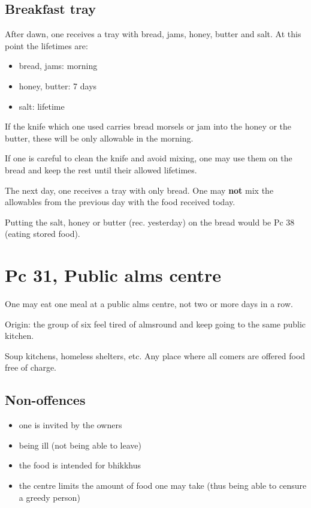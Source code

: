 \subsection{Breakfast tray}

After dawn, one receives a tray with bread, jams, honey, butter and
salt. At this point the lifetimes are:

\begin{itemize}
\tightlist
\item
  bread, jams: morning
\item
  honey, butter: 7 days
\item
  salt: lifetime
\end{itemize}

If the knife which one used carries bread morsels or jam into the honey
or the butter, these will be only allowable in the morning.

If one is careful to clean the knife and avoid mixing, one may use them
on the bread and keep the rest until their allowed lifetimes.

The next day, one receives a tray with only bread. One may \textbf{not}
mix the allowables from the previous day with the food received today.

Putting the salt, honey or butter (rec. yesterday) on the bread would be
Pc 38 (eating stored food).

\clearpage

\section{Pc 31, Public alms centre}

One may eat one meal at a public alms centre, not two or more days in a
row.

Origin: the group of six feel tired of almsround and keep going to the
same public kitchen.

Soup kitchens, homeless shelters, etc. Any place where all comers are
offered food free of charge.

\subsection{Non-offences}

\begin{itemize}
\tightlist
\item
  one is invited by the owners
\item
  being ill (not being able to leave)
\item
  the food is intended for bhikkhus
\item
  the centre limits the amount of food one may take (thus being able to
  censure a greedy person)
\end{itemize}

